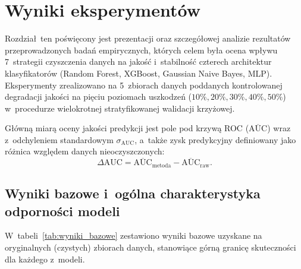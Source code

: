 \chapter{Wyniki eksperymentów}

Rozdział~ten poświęcony jest prezentacji oraz szczegółowej analizie rezultatów przeprowadzonych badań empirycznych, których celem była ocena wpływu 7~strategii czyszczenia danych na jakość i~stabilność czterech architektur klasyfikatorów (Random Forest, XGBoost, Gaussian Naive Bayes, MLP). Eksperymenty zrealizowano na 5~zbiorach danych poddanych kontrolowanej degradacji jakości na pięciu poziomach uszkodzeń ($10\%, 20\%, 30\%, 40\%, 50\%$) w~procedurze wielokrotnej stratyfikowanej walidacji krzyżowej.

Główną miarą oceny jakości predykcji jest pole pod krzywą ROC ($\overline{\mathrm{AUC}}$) wraz z~odchyleniem standardowym $\sigma_{\mathrm{AUC}}$, a~także zysk predykcyjny definiowany jako różnica względem danych nieoczyszczonych:
\begin{equation}
\Delta \mathrm{AUC} = \overline{\mathrm{AUC}}_{\text{metoda}} - \overline{\mathrm{AUC}}_{\text{raw}}.
\end{equation}

\section{Wyniki bazowe i~ogólna charakterystyka odporności modeli}
W~tabeli~\ref{tab:wyniki_bazowe} zestawiono wyniki bazowe uzyskane na oryginalnych (czystych) zbiorach danych, stanowiące górną granicę skuteczności dla każdego z~modeli.

\begin{table}[H]
\centering
\caption{Skuteczność klasyfikatorów ($\overline{\mathrm{AUC}} \pm \sigma_{\mathrm{AUC}}$) na oryginalnych zbiorach danych}
\label{tab:wyniki_bazowe}
\vspace{0.2cm}
\end{table}

